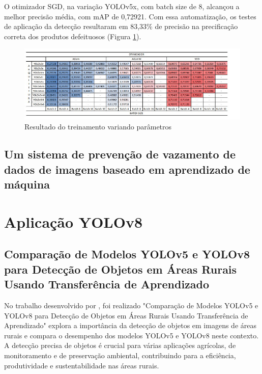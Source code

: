 O otimizador SGD, na variação YOLOv5x, com batch size de 8, alcançou a melhor precisão média, com mAP de 0,72921. Com essa automatização, os testes de aplicação da detecção resultaram em 83,33\% de precisão na precificação correta dos produtos defeituosos (Figura \ref{fig:tabela-macha}).

\begin{figure}[!h]
    \center
    \begin{minipage}{0.9\linewidth}
        \center
        \captionsetup{justification=centering,margin=0.5cm,font=small}
        \includegraphics[width=0.7\linewidth]{img/cap3/tabela-mancha.jpeg}
        \caption{Resultado do treinamento variando parâmetros}
        \label{fig:tabela-macha}
    \end{minipage}
\end{figure}


\subsection{Um sistema de prevenção de vazamento de dados de imagens baseado em aprendizado de máquina}

\section{Aplicação YOLOv8}
\subsection{Comparação de Modelos YOLOv5 e YOLOv8 para Detecção de Objetos em Áreas Rurais Usando Transferência de Aprendizado}

No trabalho desenvolvido por \cite{diascomparaccao}, foi realizado "Comparação de Modelos YOLOv5 e YOLOv8 para Detecção de Objetos em Áreas Rurais Usando Transferência de Aprendizado" explora a importância da detecção de objetos em imagens de áreas rurais e compara o desempenho dos modelos YOLOv5 e YOLOv8 neste contexto. A detecção precisa de objetos é crucial para várias aplicações agrícolas, de monitoramento e de preservação ambiental, contribuindo para a eficiência, produtividade e sustentabilidade nas áreas rurais.

